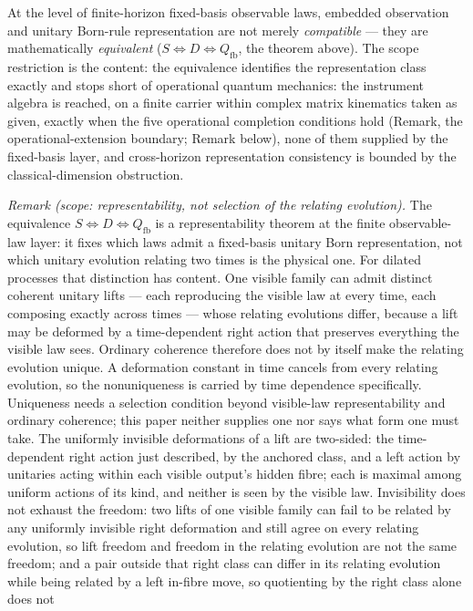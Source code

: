 \documentclass[
]{article}
\begin{document}
At the level of finite-horizon fixed-basis observable laws, embedded
observation and unitary Born-rule representation are not merely
\emph{compatible} --- they are mathematically \emph{equivalent}
(\(S \iff D \iff Q_{\mathrm{fb}}\), the theorem above). The scope
restriction is the content: the equivalence identifies the
representation class exactly and stops short of operational quantum
mechanics: the instrument algebra is reached, on a finite carrier within
complex matrix kinematics taken as given, exactly when the five
operational completion conditions hold (Remark, the
operational-extension boundary; Remark below), none of them supplied by
the fixed-basis layer, and cross-horizon representation consistency is
bounded by the classical-dimension obstruction.

\emph{Remark (scope: representability, not selection of the relating
evolution).} The equivalence \(S \iff D \iff Q_{\mathrm{fb}}\) is a
representability theorem at the finite observable-law layer: it fixes
which laws admit a fixed-basis unitary Born representation, not which
unitary evolution relating two times is the physical one. For dilated
processes that distinction has content. One visible family can admit
distinct coherent unitary lifts --- each reproducing the visible law at
every time, each composing exactly across times --- whose relating
evolutions differ, because a lift may be deformed by a time-dependent
right action that preserves everything the visible law sees. Ordinary
coherence therefore does not by itself make the relating evolution
unique. A deformation constant in time cancels from every relating
evolution, so the nonuniqueness is carried by time dependence
specifically. Uniqueness needs a selection condition beyond visible-law
representability and ordinary coherence; this paper neither supplies one
nor says what form one must take. The uniformly invisible deformations
of a lift are two-sided: the time-dependent right action just described,
by the anchored class, and a left action by unitaries acting within each
visible output's hidden fibre; each is maximal among uniform actions of
its kind, and neither is seen by the visible law. Invisibility does not
exhaust the freedom: two lifts of one visible family can fail to be
related by any uniformly invisible right deformation and still agree on
every relating evolution, so lift freedom and freedom in the relating
evolution are not the same freedom; and a pair outside that right class
can differ in its relating evolution while being related by a left
in-fibre move, so quotienting by the right class alone does not
\end{document}
